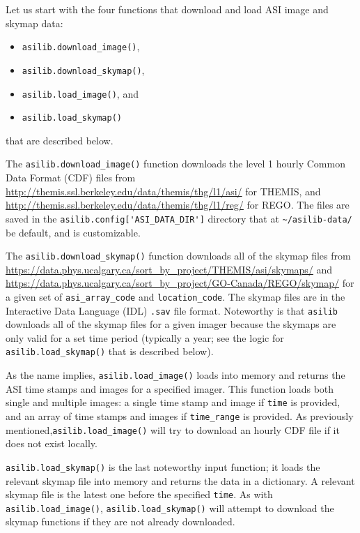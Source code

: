 \documentclass[draft]{agujournal2019}
\begin{document}
Let us start with the four functions that download and load ASI image and skymap data: 

\begin{itemize}
      \item \verb|asilib.download_image()|,
      \item \verb|asilib.download_skymap()|,
      \item \verb|asilib.load_image()|, and
      \item \verb|asilib.load_skymap()|
\end{itemize} that are described below.

The \verb|asilib.download_image()| function downloads the level 1 hourly Common Data Format (CDF) files from \url{http://themis.ssl.berkeley.edu/data/themis/thg/l1/asi/} for THEMIS, and \url{http://themis.ssl.berkeley.edu/data/themis/thg/l1/reg/} for REGO. The files are saved in the \verb|asilib.config['ASI_DATA_DIR']| directory that at \verb|~/asilib-data/| be default, and is customizable.

The \verb|asilib.download_skymap()| function downloads all of the skymap files from \url{https://data.phys.ucalgary.ca/sort_by_project/THEMIS/asi/skymaps/} and \url{https://data.phys.ucalgary.ca/sort_by_project/GO-Canada/REGO/skymap/} for a given set of \verb|asi_array_code| and \verb|location_code|. The skymap files are in the Interactive Data Language (IDL) \verb|.sav| file format. Noteworthy is that \verb|asilib| downloads all of the skymap files for a given imager because the skymaps are only valid for a set time period (typically a year; see the logic for \verb|asilib.load_skymap()| that is described below).

As the name implies, \verb|asilib.load_image()| loads into memory and returns the ASI time stamps and images for a specified imager. This function loads both single and multiple images: a single time stamp and image if \verb|time| is provided, and an array of time stamps and images if \verb|time_range| is provided. As previously mentioned,\verb|asilib.load_image()| will try to download an hourly CDF file if it does not exist locally.

\verb|asilib.load_skymap()| is the last noteworthy input function; it loads the relevant skymap file into memory and returns the data in a dictionary. A relevant skymap file is the latest one before the specified \verb|time|. As with \verb|asilib.load_image()|, \verb|asilib.load_skymap()| will attempt to download the skymap functions if they are not already downloaded.
\end{document}
